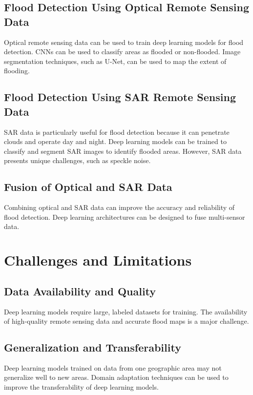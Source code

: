\documentclass{article}
\begin{document}
\subsection{Flood Detection Using Optical Remote Sensing Data}

Optical remote sensing data can be used to train deep learning models for flood detection. CNNs can be used to classify areas as flooded or non-flooded. Image segmentation techniques, such as U-Net, can be used to map the extent of flooding.

\subsection{Flood Detection Using SAR Remote Sensing Data}

SAR data is particularly useful for flood detection because it can penetrate clouds and operate day and night. Deep learning models can be trained to classify and segment SAR images to identify flooded areas. However, SAR data presents unique challenges, such as speckle noise.

\subsection{Fusion of Optical and SAR Data}

Combining optical and SAR data can improve the accuracy and reliability of flood detection. Deep learning architectures can be designed to fuse multi-sensor data.

\section{Challenges and Limitations}

\subsection{Data Availability and Quality}

Deep learning models require large, labeled datasets for training. The availability of high-quality remote sensing data and accurate flood maps is a major challenge.

\subsection{Generalization and Transferability}

Deep learning models trained on data from one geographic area may not generalize well to new areas. Domain adaptation techniques can be used to improve the transferability of deep learning models.
\end{document}
